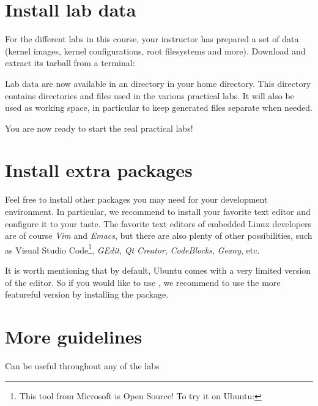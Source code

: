 
\section{Install lab data}

For the different labs in this course, your instructor has prepared a
set of data (kernel images, kernel configurations, root filesystems
and more). Download and extract its tarball from a terminal:

Lab data are now available in an  directory in
your home directory. This directory contains directories and files used in
the various practical labs. It will also be used as working space,
in particular to keep generated files separate when needed.

You are now ready to start the real practical labs!

\section{Install extra packages}

Feel free to install other packages you may need for your development
environment. In particular, we recommend to install your favorite text
editor and configure it to your taste. The favorite text editors of
embedded Linux developers are of course {\em Vim} and {\em Emacs}, but
there are also plenty of other possibilities, such as {Visual Studio
Code}\footnote{This tool from Microsoft is Open Source! To try it on
Ubuntu: }, {\em GEdit},
{\em Qt Creator}, {\em CodeBlocks}, {\em Geany}, etc.

It is worth mentioning that by default, Ubuntu comes with a very
limited version of the  editor. So if you would like to use
, we recommend to use the more featureful version by
installing the  package.

\section{More guidelines}

Can be useful throughout any of the labs

